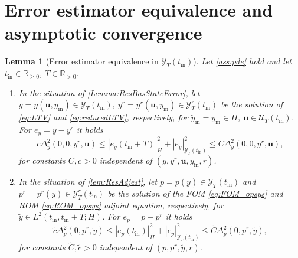 \documentclass{m2an}
\def\R{\mathbb{R}}
\newcommand{\bu}{\mathbf{u}}
\newcommand{\tint}{t_{\mathrm{in}}}
\newcommand{\yint}{y_{\mathrm{in}}}
\newcommand{\tildeyint}{\tilde y_{\mathrm{in}}}
\newcommand{\mU}{{\mathscr U}}
\newcommand{\mY}{{\mathscr Y}}
\newcommand{\norm}[2]{\left|#1\right|_{#2}}
\newtheorem{lemma}[thrm]{Lemma}
\begin{document}
\section{Error estimator equivalence and asymptotic convergence}\label{sec:APP_add_estimates}
%
\begin{lemma}[Error estimator equivalence in $\mY_T(\tint)$]\label{lemma:app_error_equivalence}
    Let \cref{ass:pde} hold and let $\tint\in\R_{\geq0}$, $T\in \R_{>0}$.
    \begin{enumerate}
        \item In the situation of \cref{Lemma:ResBasStateError}, let $y=y(\bu,\yint)\in \mY_T(\tint),\  y^r=y^r(\bu,\yint)\in \mY^r_T(\tint)$ be the solution of \eqref{eq:LTV} and \eqref{eq:reducedLTV}, respectively, for $\tildeyint=\yint\in H$, $\bu\in \mU_T(\tint)$. For $e_y = y-y^r$ it holds
     \begin{equation}\label{eq:state_errorest_equiv}
     c \Delta^2_{y}(0,0, y^r,\bu)\leq \norm{e_y(\tint+T)}{H}^2+\norm{e_y}{\mY_T(\tint)}^2\leq C\Delta^2_y(0,0,y^r, \bu),
    \end{equation}
    for constants $C,c>0$ independent of $(y,y^r,\bu, \yint,r)$.
    \item In the situation of \cref{lem:ResAdjest}, let $p=p(\tilde y)\in  \mY_T(\tint)$ and $p^r=p^r(\tilde y)\in \mY^r_T(\tint)$ be the solution of the FOM \eqref{eq:FOM_opsys} and ROM \eqref{eq:ROM_opsys} adjoint equation, respectively, for $\tilde y\in L^2(\tint,\tint+T;H)$. For $e_p = p-p^r$ it holds
    \begin{equation}\label{eq:adstate_errorest_equiv}
    \tilde c\Delta^2_{p}(0, p^r, \tilde y) \leq \norm{e_p(\tint)}{H}^2+\norm{e_p}{\mY_T(\tint)}^2\leq \tilde C\Delta^2_{p}(0, p^r, \tilde y),
    \end{equation}
    for constants $\tilde C,\tilde c>0$ independent of $(p,p^r,\tilde y,r)$.
    \end{enumerate}
\end{lemma}
%
\end{document}
